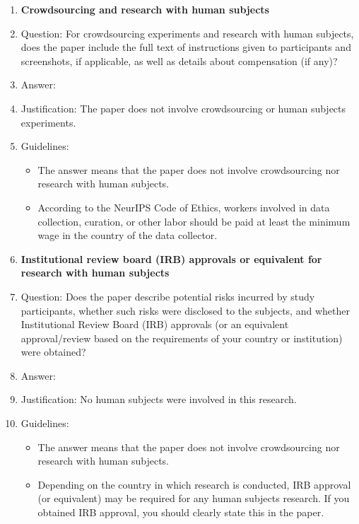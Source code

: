 \begin{enumerate}
\item {\bf Crowdsourcing and research with human subjects}
    \item[] Question: For crowdsourcing experiments and research with human subjects, does the paper include the full text of instructions given to participants and screenshots, if applicable, as well as details about compensation (if any)?
    \item[] Answer: \answerNA{}
    \item[] Justification: The paper does not involve crowdsourcing or human subjects experiments.
    \item[] Guidelines:
    \begin{itemize}
        \item The answer \answerNA{} means that the paper does not involve crowdsourcing nor research with human subjects.
        \item According to the NeurIPS Code of Ethics, workers involved in data collection, curation, or other labor should be paid at least the minimum wage in the country of the data collector.
    \end{itemize}

\item {\bf Institutional review board (IRB) approvals or equivalent for research with human subjects}
    \item[] Question: Does the paper describe potential risks incurred by study participants, whether such risks were disclosed to the subjects, and whether Institutional Review Board (IRB) approvals (or an equivalent approval/review based on the requirements of your country or institution) were obtained?
    \item[] Answer: \answerNA{}
    \item[] Justification: No human subjects were involved in this research.
    \item[] Guidelines:
    \begin{itemize}
        \item The answer \answerNA{} means that the paper does not involve crowdsourcing nor research with human subjects.
        \item Depending on the country in which research is conducted, IRB approval (or equivalent) may be required for any human subjects research. If you obtained IRB approval, you should clearly state this in the paper.
    \end{itemize}


\end{enumerate}

